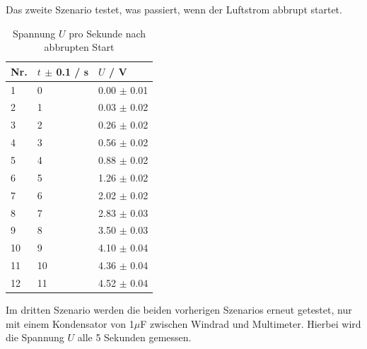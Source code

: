 \documentclass[12pt,a4paper,twoside]{article}
\begin{document}
\noindent
Das zweite Szenario testet, was passiert, wenn der Luftstrom abbrupt startet. 
\begin{table}[H]
    \centering
    \caption{Spannung $U$ pro Sekunde nach abbrupten Start}
    \label{tab:Messdaten Windkraft abbrupt start}
    \begin{tabular}{| l | l | l |}
        \hline
        Nr. & $t$ $\pm $ 0.1 / s & $U$ / V \\
        \hline
        1  & 0  & 0.00 $\pm$ 0.01   \\
        2  & 1  & 0.03 $\pm$ 0.02   \\
        3  & 2  & 0.26 $\pm$ 0.02   \\
        4  & 3  & 0.56 $\pm$ 0.02   \\
        5  & 4  & 0.88 $\pm$ 0.02   \\
        6  & 5  & 1.26 $\pm$ 0.02   \\
        7  & 6  & 2.02 $\pm$ 0.02   \\
        8  & 7  & 2.83 $\pm$ 0.03   \\
        9  & 8  & 3.50 $\pm$ 0.03   \\
        10 & 9  & 4.10 $\pm$ 0.04   \\
        11 & 10 & 4.36 $\pm$ 0.04   \\
        12 & 11 & 4.52 $\pm$ 0.04   \\
        \hline  
    \end{tabular}
\end{table}

\noindent
Im dritten Szenario werden die beiden vorherigen Szenarios erneut getestet, nur mit einem Kondensator von 1$\mu$F zwischen Windrad und Multimeter. 
Hierbei wird die Spannung $U$ alle 5 Sekunden gemessen. 
\end{document}
